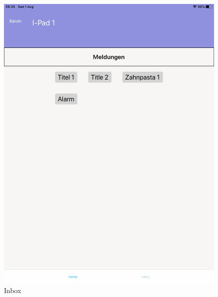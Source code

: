 \begin{figure}[h]
    \centering
    \begin{minipage}[b]{0.4\textwidth}
        \includegraphics[width=\textwidth]{graphics/screenshots/mobileclient/screenshot-homescreen}
        \caption{Inbox}
    \end{minipage}
    \hfill
    \begin{minipage}[b]{0.4\textwidth}

\end{minipage}
\end{figure}
